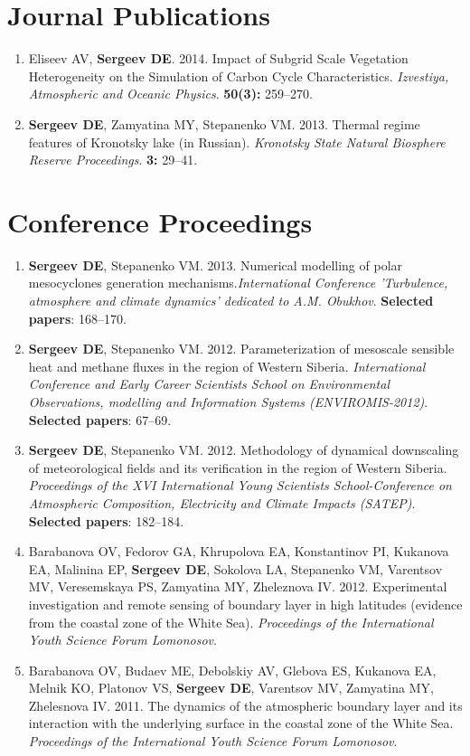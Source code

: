 \documentclass[a4paper,10pt]{article}
\makeatletter
\newlength{\bibhang}
\newlength{\bibsep}
 {\@listi \global\bibsep\itemsep \global\advance\bibsep by\parsep}
\newenvironment{bibsection}%
        {\begin{enumerate}{}{%
       \setlength{\leftmargin}{\bibhang}%
       \setlength{\itemindent}{-\leftmargin}%
       \setlength{\itemsep}{\bibsep}%
       \setlength{\parsep}{\z@}%
        \setlength{\partopsep}{0pt}%
        \setlength{\topsep}{0pt}}}
        {\end{enumerate}\vspace{-.6\baselineskip}}
\makeatother
\begin{document}
\section{Journal Publications}
\begin{bibsection}
    \item Eliseev AV, {\bf Sergeev DE}. 2014. Impact of Subgrid Scale Vegetation Heterogeneity on the Simulation of Carbon Cycle Characteristics. \emph{Izvestiya, Atmospheric and Oceanic Physics}. \textbf{50(3):} 259--270.
    \item {\bf Sergeev DE}, Zamyatina MY, Stepanenko VM. 2013. Thermal regime features of Kronotsky lake (in Russian). \emph{Kronotsky State Natural Biosphere Reserve Proceedings}. \textbf{3:} 29--41.
\end{bibsection}

\section{Conference Proceedings}
\begin{bibsection}
    \item {\bf Sergeev DE}, Stepanenko VM. 2013. Numerical modelling of polar mesocyclones generation mechanisms.\emph{International Conference 'Turbulence, atmosphere and climate dynamics' dedicated to A.M. Obukhov}. {\bf Selected papers}: 168--170.
    \item {\bf Sergeev DE}, Stepanenko VM. 2012. Parameterization of mesoscale sensible heat and methane fluxes in the region of Western Siberia. \emph{International Conference and Early Career Scientists School on Environmental Observations, modelling and Information Systems (ENVIROMIS-2012)}. {\bf Selected papers}: 67--69.
    \item {\bf Sergeev DE}, Stepanenko VM. 2012. Methodology of dynamical downscaling of meteorological fields and its verification in the region of Western Siberia. \emph{Proceedings of the XVI International Young Scientists School-Conference on Atmospheric Composition, Electricity and Climate Impacts (SATEP)}. {\bf Selected papers}: 182--184.
    \item Barabanova OV, Fedorov GA, Khrupolova EA, Konstantinov PI, Kukanova EA, Malinina EP, {\bf Sergeev DE}, Sokolova LA, Stepanenko VM, Varentsov MV, Veresemskaya PS, Zamyatina MY, Zheleznova IV. 2012. Experimental investigation and remote sensing of boundary layer in high latitudes (evidence from the coastal zone of the White Sea). \emph{Proceedings of the International Youth Science Forum Lomonosov}.
    \item Barabanova OV, Budaev ME, Debolskiy AV, Glebova ES, Kukanova EA, Melnik KO, Platonov VS,  {\bf Sergeev DE}, Varentsov MV, Zamyatina MY, Zhelesnova IV. 2011. The dynamics of the atmospheric boundary layer and its interaction with the underlying surface in the coastal zone of the White Sea. \emph{Proceedings of the International Youth Science Forum Lomonosov}.
\end{bibsection}
\end{document}
